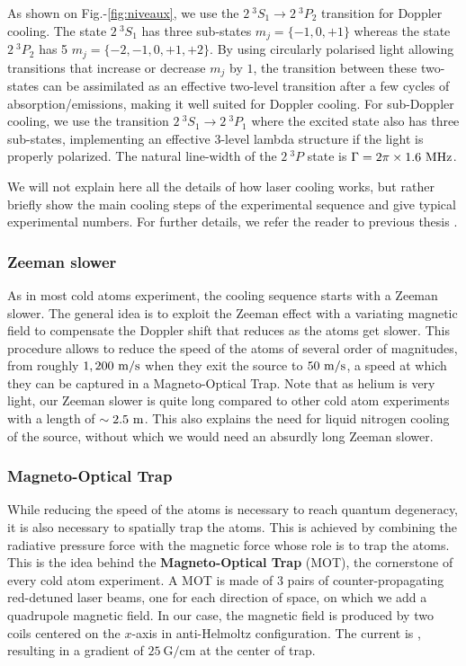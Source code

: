 As shown on Fig.-\ref{fig:niveaux}, we use the $2 \ ^3 S_1 \rightarrow 2 \ ^3 P_2$ transition for Doppler cooling. The state $2 \ ^3 S_1$ has three sub-states $m_j=\{-1,0,+1\}$ whereas the state $2 \ ^3 P_2$ has 5 $m_j=\{-2,-1,0,+1,+2\}$. By using circularly polarised light allowing transitions that increase or decrease $m_j$ by $1$, the transition between these two-states can be assimilated as an effective two-level transition after a few cycles of absorption/emissions, making it well suited for Doppler cooling. For sub-Doppler cooling, we use the transition  $2 \ ^3 S_1 \rightarrow 2 \ ^3 P_1$ where the excited state also has three sub-states, implementing an effective 3-level lambda structure if the light is properly polarized. The natural line-width of the $2 \ ^3 P$ state is $\Gamma = 2 \pi \times 1.6 \ \rm{MHz}$.

We will not explain here all the details of how laser cooling works, but rather briefly show the main cooling steps of the experimental sequence and give typical experimental numbers. For further details, we refer the reader to previous thesis \cite{hoend2014,bouton_these,cayla_these}.


\subsubsection{Zeeman slower}

As in most cold atoms experiment, the cooling sequence starts with a Zeeman slower. The general idea is to exploit the Zeeman effect with a variating magnetic field to compensate the Doppler shift that reduces as the atoms get slower. This procedure allows to reduce the speed of the atoms of several order of magnitudes, from roughly $1,200 \ \rm{m/s}$ when they exit the source to $50 \ \rm{m/s}$, a speed at which they can be captured in a Magneto-Optical Trap. Note that as helium is very light, our Zeeman slower is quite long compared to other cold atom experiments with a length of $\sim 2.5 \ \rm{m}$. This also explains the need for liquid nitrogen cooling of the source, without which we would need an absurdly long Zeeman slower.

\subsubsection{Magneto-Optical Trap}

While reducing the speed of the atoms is necessary to reach quantum degeneracy, it is also necessary to spatially trap the atoms. This is achieved by combining the radiative pressure force with the magnetic force whose role is to trap the atoms. This is the idea behind the \textbf{Magneto-Optical Trap} (MOT), the cornerstone of every cold atom experiment. A MOT is made of 3 pairs of counter-propagating red-detuned laser beams, one for each direction of space, on which we add a quadrupole magnetic field. In our case, the magnetic field is produced by two coils centered on the $x$-axis in anti-Helmoltz configuration. The current is , resulting in a gradient of $25 \ \mathrm{G/cm}$ at the center of trap.

